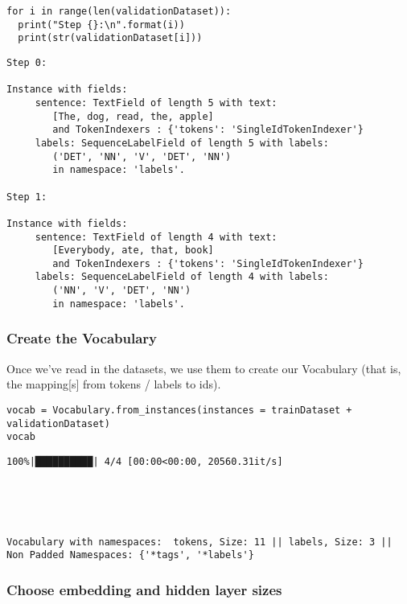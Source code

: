 \documentclass[
]{article}
\begin{document}
\begin{verbatim}
for i in range(len(validationDataset)): 
  print("Step {}:\n".format(i))
  print(str(validationDataset[i]))
\end{verbatim}

\begin{verbatim}
Step 0:

Instance with fields:
     sentence: TextField of length 5 with text: 
        [The, dog, read, the, apple]
        and TokenIndexers : {'tokens': 'SingleIdTokenIndexer'} 
     labels: SequenceLabelField of length 5 with labels:
        ('DET', 'NN', 'V', 'DET', 'NN')
        in namespace: 'labels'. 

Step 1:

Instance with fields:
     sentence: TextField of length 4 with text: 
        [Everybody, ate, that, book]
        and TokenIndexers : {'tokens': 'SingleIdTokenIndexer'} 
     labels: SequenceLabelField of length 4 with labels:
        ('NN', 'V', 'DET', 'NN')
        in namespace: 'labels'. 
\end{verbatim}

\hypertarget{create-the-vocabulary}{%
\subsubsection{Create the Vocabulary}\label{create-the-vocabulary}}

Once we've read in the datasets, we use them to create our Vocabulary
(that is, the mapping{[}s{]} from tokens / labels to ids).

\begin{verbatim}
vocab = Vocabulary.from_instances(instances = trainDataset + validationDataset)
vocab
\end{verbatim}

\begin{verbatim}
100%|██████████| 4/4 [00:00<00:00, 20560.31it/s]





Vocabulary with namespaces:  tokens, Size: 11 || labels, Size: 3 || Non Padded Namespaces: {'*tags', '*labels'}
\end{verbatim}

\hypertarget{choose-embedding-and-hidden-layer-sizes}{%
\subsubsection{Choose embedding and hidden layer
sizes}\label{choose-embedding-and-hidden-layer-sizes}}
\end{document}
